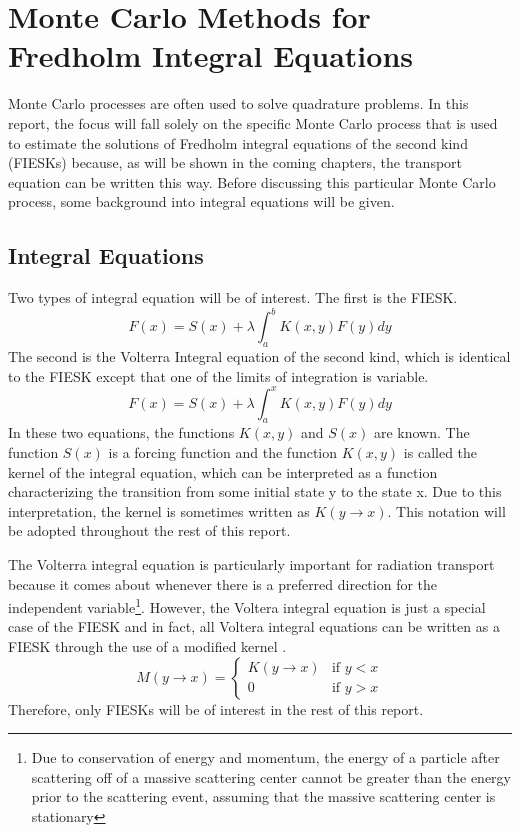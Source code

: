 \chapter{Monte Carlo Methods for Fredholm Integral Equations}
\label{ch:mc_methods}
Monte Carlo processes are often used to solve quadrature problems. In this 
report, the focus will fall solely on the specific Monte Carlo process that is 
used to estimate the solutions of Fredholm integral equations of the second 
kind (FIESKs) because, as will be shown in the coming chapters, the transport 
equation can be written this way. Before discussing this particular Monte Carlo 
process, some background into integral equations will be given. 

\section{Integral Equations}
\label{sec:integral_equations}
Two types of integral equation will be of interest. The first is the FIESK.
\begin{equation}
  F(x) = S(x) + \lambda \int_a^b K(x,y) F(y)dy
  \label{eq:fredholm_int_eqn}
\end{equation}
The second is the Volterra Integral equation of the second kind, which is 
identical to the FIESK except that one of the limits of integration is variable.
\begin{equation}
  F(x) = S(x) + \lambda \int_a^x K(x,y) F(y) dy
  \label{eq:volterra_int_eqn}
\end{equation}
In these two equations, the functions $K(x,y)$ and $S(x)$ are known. The 
function $S(x)$ is a forcing function and the function $K(x,y)$ is called the 
kernel of the integral equation, which can be interpreted as a function 
characterizing the transition from some initial state y to the state x. Due to 
this interpretation, the kernel is sometimes written as $K(y \to x)$. This 
notation will be adopted throughout the rest of this report.

The Volterra integral equation is particularly important for radiation 
transport because it comes about whenever there is a preferred direction for the
independent variable\footnote{Due to conservation of energy and momentum, 
the energy of a particle after scattering off of a massive scattering center 
cannot be greater than the energy prior to the scattering event, assuming that 
the massive scattering center is stationary}. However, the Voltera integral 
equation is just a special case of the FIESK and in fact, all Voltera integral
equations can be written as a FIESK through the use of a modified kernel 
\citep{rahman_integral_2007}. 
\begin{equation}
  M(y \to x) = 
  \begin{cases}
    K(y \to x) & \text{if }y < x \\
    0 & \text{if }y > x 
  \end{cases}
\end{equation}
Therefore, only FIESKs will be of interest in the rest of this report.

